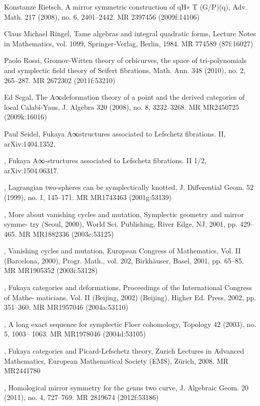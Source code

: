 {\begin{list}{}{%
  \setlength{\leftmargin}{3.4em}%
  \setlength{\itemindent}{-3.4em}%
  \setlength{\itemsep}{1.5pt}%
  \setlength{\parsep}{0pt}%
  \setlength{\listparindent}{0pt}%
}
\item[{[Rie08]}] Konstanze Rietsch, A mirror symmetric construction of qH∗ T (G/P)(q), Adv. Math. 217 (2008), no. 6, 2401--2442. MR 2397456 (2009f:14106)
\item[{[Rin84]}] Claus Michael Ringel, Tame algebras and integral quadratic forms, Lecture Notes in Mathematics, vol. 1099, Springer-Verlag, Berlin, 1984. MR 774589 (87f:16027)
\item[{[Ros10]}] Paolo Rossi, Gromov-Witten theory of orbicurves, the space of tri-polynomials and symplectic field theory of Seifert fibrations, Math. Ann. 348 (2010), no. 2, 265--287. MR 2672302 (2011f:53210)
\item[{[Seg08]}] Ed Segal, The A∞deformation theory of a point and the derived categories of local Calabi-Yaus, J. Algebra 320 (2008), no. 8, 3232--3268. MR MR2450725 (2009k:16016)
\item[{[Seia]}] Paul Seidel, Fukaya A∞structures associated to Lefschetz fibrations. II, arXiv:1404.1352.
\item[{[Seib]}] , Fukaya A∞-structures associated to Lefschetz fibrations. II 1/2, arXiv:1504.06317.
\item[{[Sei99]}] , Lagrangian two-spheres can be symplectically knotted, J. Differential Geom. 52 (1999), no. 1, 145--171. MR MR1743463 (2001g:53139)
\item[{[Sei01a]}] , More about vanishing cycles and mutation, Symplectic geometry and mirror symme- try (Seoul, 2000), World Sci. Publishing, River Edge, NJ, 2001, pp. 429--465. MR MR1882336 (2003c:53125)
\item[{[Sei01b]}] , Vanishing cycles and mutation, European Congress of Mathematics, Vol. II (Barcelona, 2000), Progr. Math., vol. 202, Birkhäuser, Basel, 2001, pp. 65--85. MR MR1905352 (2003i:53128)
\item[{[Sei02]}] , Fukaya categories and deformations, Proceedings of the International Congress of Mathe- maticians, Vol. II (Beijing, 2002) (Beijing), Higher Ed. Press, 2002, pp. 351--360. MR MR1957046 (2004a:53110)
\item[{[Sei03]}] , A long exact sequence for symplectic Floer cohomology, Topology 42 (2003), no. 5, 1003-- 1063. MR MR1978046 (2004d:53105)
\item[{[Sei08]}] , Fukaya categories and Picard-Lefschetz theory, Zurich Lectures in Advanced Mathematics, European Mathematical Society (EMS), Zürich, 2008. MR MR2441780
\item[{[Sei11]}] , Homological mirror symmetry for the genus two curve, J. Algebraic Geom. 20 (2011), no. 4, 727--769. MR 2819674 (2012f:53186)

\end{list}}
